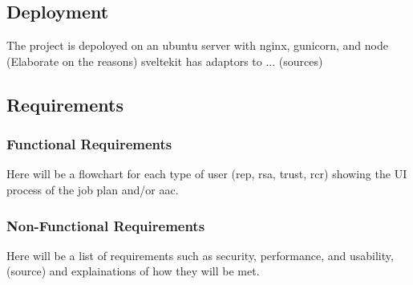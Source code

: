 \begin{multicols}{2}
\subsection{Deployment}
The project is depoloyed on an ubuntu server with nginx, gunicorn, and node (Elaborate on the reasons) sveltekit has adaptors to ... (sources)

\subsection{Requirements}
\subsubsection{Functional Requirements}
Here will be a flowchart for each type of user (rep, rsa, trust, rcr) showing the UI process of the job plan and/or aac. 

\subsubsection{Non-Functional Requirements}
Here will be a list of requirements such as security, performance, and usability, (source) and explainations of how they will be met.

\end{multicols}